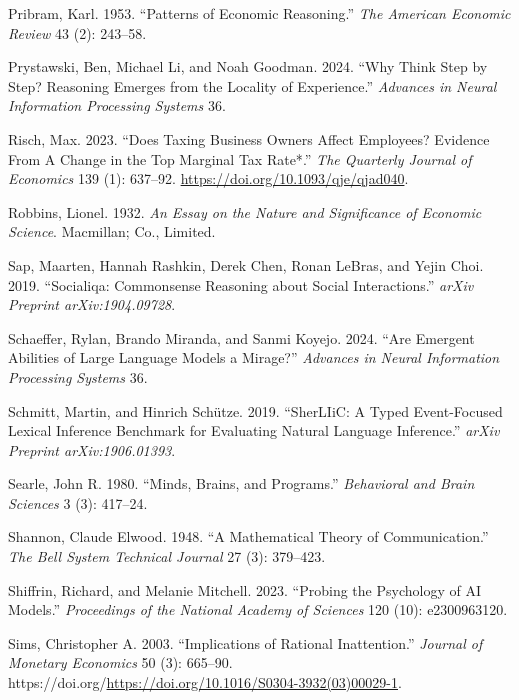 \documentclass[
]{article}
\newlength{\cslhangindent}
\newenvironment{CSLReferences}[2] %
 {\begin{list}{}{%
  \setlength{\itemindent}{0pt}
  \setlength{\leftmargin}{0pt}
  \setlength{\parsep}{0pt}
  \ifodd #1
   \setlength{\leftmargin}{\cslhangindent}
   \setlength{\itemindent}{-1\cslhangindent}
  \fi
  \setlength{\itemsep}{#2\baselineskip}}}
 {\end{list}}
\begin{document}
\begin{CSLReferences}{1}{0}
Pribram, Karl. 1953. {``Patterns of Economic Reasoning.''} \emph{The
American Economic Review} 43 (2): 243--58.

Prystawski, Ben, Michael Li, and Noah Goodman. 2024. {``Why Think Step
by Step? Reasoning Emerges from the Locality of Experience.''}
\emph{Advances in Neural Information Processing Systems} 36.

Risch, Max. 2023. {``{Does Taxing Business Owners Affect Employees?
Evidence From A Change in the Top Marginal Tax Rate*}.''} \emph{The
Quarterly Journal of Economics} 139 (1): 637--92.
\url{https://doi.org/10.1093/qje/qjad040}.

Robbins, Lionel. 1932. \emph{An Essay on the Nature and Significance of
Economic Science}. Macmillan; Co., Limited.

Sap, Maarten, Hannah Rashkin, Derek Chen, Ronan LeBras, and Yejin Choi.
2019. {``Socialiqa: Commonsense Reasoning about Social Interactions.''}
\emph{arXiv Preprint arXiv:1904.09728}.

Schaeffer, Rylan, Brando Miranda, and Sanmi Koyejo. 2024. {``Are
Emergent Abilities of Large Language Models a Mirage?''} \emph{Advances
in Neural Information Processing Systems} 36.

Schmitt, Martin, and Hinrich Schütze. 2019. {``SherLIiC: A Typed
Event-Focused Lexical Inference Benchmark for Evaluating Natural
Language Inference.''} \emph{arXiv Preprint arXiv:1906.01393}.

Searle, John R. 1980. {``Minds, Brains, and Programs.''}
\emph{Behavioral and Brain Sciences} 3 (3): 417--24.

Shannon, Claude Elwood. 1948. {``A Mathematical Theory of
Communication.''} \emph{The Bell System Technical Journal} 27 (3):
379--423.

Shiffrin, Richard, and Melanie Mitchell. 2023. {``Probing the Psychology
of AI Models.''} \emph{Proceedings of the National Academy of Sciences}
120 (10): e2300963120.

Sims, Christopher A. 2003. {``Implications of Rational Inattention.''}
\emph{Journal of Monetary Economics} 50 (3): 665--90.
https://doi.org/\url{https://doi.org/10.1016/S0304-3932(03)00029-1}.


\end{CSLReferences}
\end{document}
